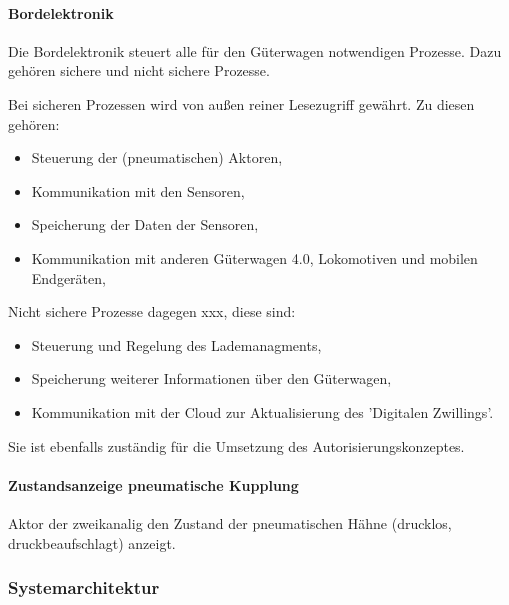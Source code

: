 \paragraph{Bordelektronik}
Die Bordelektronik steuert alle für den Güterwagen notwendigen Prozesse. Dazu gehören sichere und nicht sichere Prozesse.\par
Bei sicheren Prozessen wird von außen reiner Lesezugriff gewährt. Zu diesen gehören:
\begin{itemize}
    \item Steuerung der (pneumatischen) Aktoren,
    \item Kommunikation mit den Sensoren,
    \item Speicherung der Daten der Sensoren,
    \item Kommunikation mit anderen Güterwagen 4.0, Lokomotiven und mobilen Endgeräten,
\end{itemize}
Nicht sichere Prozesse dagegen xxx, diese sind:
\begin{itemize}
    \item Steuerung und Regelung des Lademanagments,
    \item Speicherung weiterer Informationen über den Güterwagen,
    \item Kommunikation mit der Cloud zur Aktualisierung des 'Digitalen Zwillings'.
\end{itemize}
Sie ist ebenfalls zuständig für die Umsetzung des Autorisierungskonzeptes.
\paragraph{Zustandsanzeige pneumatische Kupplung}\label{sec:ZustandKupplung}
Aktor der zweikanalig den Zustand der pneumatischen Hähne (drucklos, druckbeaufschlagt) anzeigt.




\subsubsection{Systemarchitektur}

